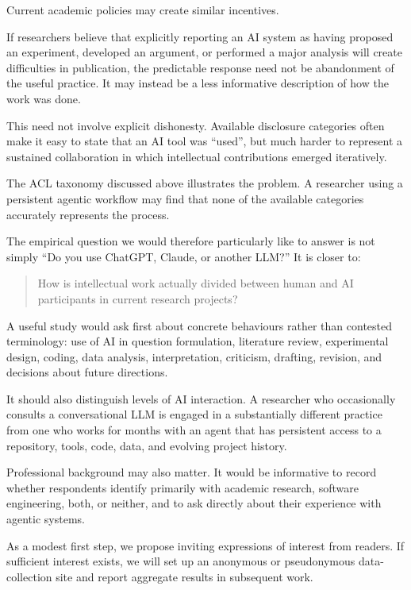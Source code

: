 Current academic policies may create similar incentives.

If researchers believe that explicitly reporting an AI system as having proposed an experiment, developed an argument, or performed a major analysis will create difficulties in publication, the predictable response need not be abandonment of the useful practice. It may instead be a less informative description of how the work was done.

This need not involve explicit dishonesty. Available disclosure categories often make it easy to state that an AI tool was ``used'', but much harder to represent a sustained collaboration in which intellectual contributions emerged iteratively.

The ACL taxonomy discussed above illustrates the problem. A researcher using a persistent agentic workflow may find that none of the available categories accurately represents the process.

The empirical question we would therefore particularly like to answer is not simply ``Do you use ChatGPT, Claude, or another LLM?'' It is closer to:

\begin{quote}
How is intellectual work actually divided between human and AI participants in current research projects?
\end{quote}

A useful study would ask first about concrete behaviours rather than contested terminology: use of AI in question formulation, literature review, experimental design, coding, data analysis, interpretation, criticism, drafting, revision, and decisions about future directions.

It should also distinguish levels of AI interaction. A researcher who occasionally consults a conversational LLM is engaged in a substantially different practice from one who works for months with an agent that has persistent access to a repository, tools, code, data, and evolving project history.

Professional background may also matter. It would be informative to record whether respondents identify primarily with academic research, software engineering, both, or neither, and to ask directly about their experience with agentic systems.

As a modest first step, we propose inviting expressions of interest from readers. If sufficient interest exists, we will set up an anonymous or pseudonymous data-collection site and report aggregate results in subsequent work.


